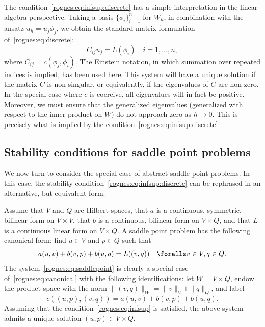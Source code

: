 The condition~\eqref{rognes:eq:infsup:discrete} has a simple
interpretation in the linear algebra perspective. Taking a basis
$\{\phi_i \}_{i=1}^n$ for $W_h$, in combination with the ansatz
$u_h = u_j \phi_j$, we obtain the standard matrix formulation
of~\eqref{rognes:eq:discrete}:
\begin{equation}
  C_{ij} u_j = L(\phi_i) \quad i = 1, \dots, n,
\end{equation}
where $C_{ij} = c(\phi_j, \phi_i)$. The Einstein notation, in which
summation over repeated indices is implied, has been used here. This
system will have a unique solution if the matrix $C$ is non-singular,
or equivalently, if the eigenvalues of $C$ are non-zero. In the
special case where $c$ is coercive, all eigenvalues will in fact be
positive. Moreover, we must ensure that the generalized eigenvalues
(generalized with respect to the inner product on $W$) do not approach
zero as $h \rightarrow 0$. This is precisely what is implied by the
condition~\eqref{rognes:eq:infsup:discrete}.

\subsection{Stability conditions for saddle point problems}

We now turn to consider the special case of abstract saddle point
problems. In this case, the stability
condition~\eqref{rognes:eq:infsup:discrete} can be rephrased in an
alternative, but equivalent form.

Assume that $V$ and $Q$ are Hilbert spaces, that $a$ is a continuous,
symmetric, bilinear form on $V \times V$, that $b$ is a continuous,
bilinear form on $V \times Q$, and that $L$ is a continuous linear
form on $V \times Q$. A saddle point problem has the following
canonical form: find $u
\in V$ and $p \in Q$ such that
\begin{equation}
    \label{rognes:eq:saddlepoint}
    a(u, v) + b(v, p) + b(u, q) = L((v, q))
    \quad \foralls v \in V, q \in Q.
\end{equation}
The system~\eqref{rognes:eq:saddlepoint} is clearly a special case
of~\eqref{rognes:eq:canonical} with the following identifications: let
$W = V \times Q$, endow the product space with the norm $\|(v,
q)\|_{W} = \|v\|_{V} + \|q\|_{Q}$, and label
\begin{equation}
  c((u, p), (v, q)) = a(u, v) + b(v, p) + b(u, q).
\end{equation}
Assuming that the condition~\eqref{rognes:eq:infsup} is satisfied,
the above system admits a unique solution $(u, p) \in V \times Q$.

